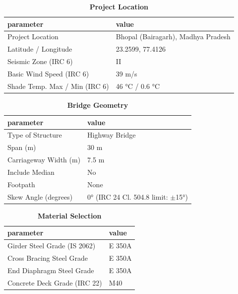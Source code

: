 \documentclass[12pt,a4paper]{report}
\numberwithin{table}{chapter}
\numberwithin{figure}{chapter}
\begin{document}
\begin{table}[H]
\caption{\textbf{Project Location}}
\label{subsec:project-location}
\begin{tabular}{|L{5.5cm}|L{8.5cm}|}
\hline
\textbf{parameter} & \textbf{value} \\
\hline
\textnormal{Project Location} & Bhopal (Bairagarh), Madhya Pradesh \\
\hline
\textnormal{Latitude / Longitude} & 23.2599, 77.4126 \\
\hline
\textnormal{Seismic Zone (IRC 6)} & II \\
\hline
\textnormal{Basic Wind Speed (IRC 6)} & 39 m/s \\
\hline
\textnormal{Shade Temp. Max / Min (IRC 6)} & 46 °C / 0.6 °C \\
\hline
\end{tabular}
\vspace{0.4cm}
\end{table}

\begin{table}[H]
\caption{\textbf{Bridge Geometry}}
\label{subsec:bridge-geometry}
\begin{tabular}{|L{5.5cm}|L{8.5cm}|}
\hline
\textbf{parameter} & \textbf{value} \\
\hline
\textnormal{Type of Structure} & Highway Bridge \\
\hline
\textnormal{Span (m)} & 30 m \\
\hline
\textnormal{Carriageway Width (m)} & 7.5 m \\
\hline
\textnormal{Include Median} & No \\
\hline
\textnormal{Footpath} & None \\
\hline
\textnormal{Skew Angle (degrees)} & 0° (IRC 24 Cl. 504.8 limit: $\pm$15°) \\
\hline
\end{tabular}
\end{table}
\vspace{0.4cm}

\begin{table}[H]
\caption{\textbf{Material Selection}}
\label{subsec:material}
\begin{tabular}{|L{5.5cm}|L{8.5cm}|}
\hline
\textbf{parameter} & \textbf{value} \\
\hline
\textnormal{Girder Steel Grade (IS 2062)} & E 350A \\
\hline
\textnormal{Cross Bracing Steel Grade} & E 350A \\
\hline
\textnormal{End Diaphragm Steel Grade} & E 350A \\
\hline
\textnormal{Concrete Deck Grade (IRC 22)} & M40 \\
\hline
\end{tabular}
\end{table}
\vspace{0.4cm}
\end{document}
